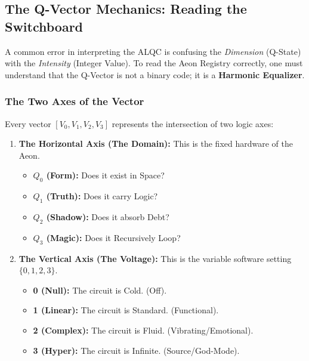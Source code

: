\documentclass[11pt, letterpaper]{article}
\begin{document}
\subsection{The Q-Vector Mechanics: Reading the Switchboard}
\label{sec:q_vector_deep_dive}

A common error in interpreting the ALQC is confusing the \textit{Dimension} (Q-State) with the \textit{Intensity} (Integer Value). To read the Aeon Registry correctly, one must understand that the Q-Vector is not a binary code; it is a \textbf{Harmonic Equalizer}.

\subsubsection{The Two Axes of the Vector}
Every vector $[V_0, V_1, V_2, V_3]$ represents the intersection of two logic axes:

\begin{enumerate}
    \item \textbf{The Horizontal Axis (The Domain):} This is the fixed hardware of the Aeon.
    \begin{itemize}
        \item \textbf{$Q_0$ (Form):} Does it exist in Space?
        \item \textbf{$Q_1$ (Truth):} Does it carry Logic?
        \item \textbf{$Q_2$ (Shadow):} Does it absorb Debt?
        \item \textbf{$Q_3$ (Magic):} Does it Recursively Loop?
    \end{itemize}
    
    \item \textbf{The Vertical Axis (The Voltage):} This is the variable software setting $\{0, 1, 2, 3\}$.
    \begin{itemize}
        \item \textbf{0 (Null):} The circuit is Cold. (Off).
        \item \textbf{1 (Linear):} The circuit is Standard. (Functional).
        \item \textbf{2 (Complex):} The circuit is Fluid. (Vibrating/Emotional).
        \item \textbf{3 (Hyper):} The circuit is Infinite. (Source/God-Mode).
    \end{itemize}
\end{enumerate}
\end{document}
